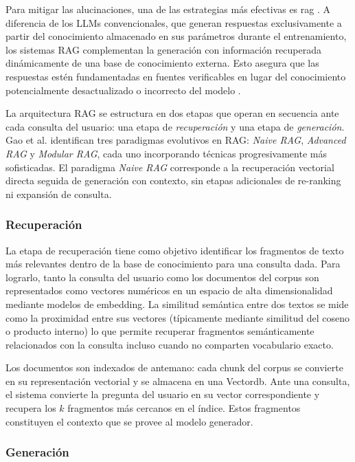 Para mitigar las alucinaciones, una de las estrategias más efectivas es \acrlong{rag} \cite{lewis2020retrieval}. A diferencia de los LLMs convencionales, que generan respuestas exclusivamente a partir del conocimiento almacenado en sus parámetros durante el entrenamiento, los sistemas RAG complementan la generación con información recuperada dinámicamente de una base de conocimiento externa. Esto asegura que las respuestas estén fundamentadas en fuentes verificables en lugar del conocimiento potencialmente desactualizado o incorrecto del modelo \cite{lewis2020retrieval}.

La arquitectura RAG se estructura en dos etapas que operan en secuencia ante cada consulta del usuario: una etapa de \textit{recuperación} y una etapa de \textit{generación}. Gao et al. \cite{gao2023retrieval} identifican tres paradigmas evolutivos en RAG: \textit{Naive RAG}, \textit{Advanced RAG} y \textit{Modular RAG}, cada uno incorporando técnicas progresivamente más sofisticadas. El paradigma \textit{Naive RAG} corresponde a la recuperación vectorial directa seguida de generación con contexto, sin etapas adicionales de re-ranking ni expansión de consulta.

\subsubsection{Recuperación}
\label{subsubsection:2-Retrieval}

La etapa de recuperación tiene como objetivo identificar los fragmentos de texto más relevantes dentro de la base de conocimiento para una consulta dada. Para lograrlo, tanto la consulta del usuario como los documentos del corpus son representados como vectores numéricos en un espacio de alta dimensionalidad mediante modelos de embedding. La similitud semántica entre dos textos se mide como la proximidad entre sus vectores (típicamente mediante similitud del coseno o producto interno) lo que permite recuperar fragmentos semánticamente relacionados con la consulta incluso cuando no comparten vocabulario exacto.

Los documentos son indexados de antemano: cada chunk del corpus se convierte en su representación vectorial y se almacena en una \gls{Vectordb}. Ante una consulta, el sistema convierte la pregunta del usuario en su vector correspondiente y recupera los $k$ fragmentos más cercanos en el índice. Estos fragmentos constituyen el contexto que se provee al modelo generador.

\subsubsection{Generación}
\label{subsubsection:2-Generation}

